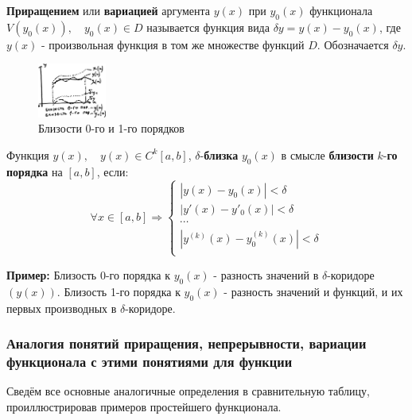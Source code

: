 \documentclass[12pt, a4paper]{article}
\begin{document}
\textbf{Приращением} или \textbf{вариацией} аргумента $y(x)$ при $y_0(x)$ функционала $V(y_0(x)), \quad y_0(x) \in D$ называется функция вида $\delta y = y(x) - y_0(x)$, где $y(x)$ - произвольная функция в том же множестве функций $D$. Обозначается $\delta y$.

\begin{figure}
  \centering
  \includegraphics[width=0.2\textwidth]{20}
  \vspace{-4mm}
  \caption{Близости 0-го и 1-го порядков}
\end{figure}

Функция $y(x), \quad y(x) \in C^k[a, b]$, $\delta$-\textbf{близка} $y_0(x)$ в смысле \textbf{близости} $k$-\textbf{го порядка} на $[a, b]$, если:
\[\forall x \in [a, b] \Rightarrow \begin{cases} |y(x) - y_0(x)| < \delta \\ |y'(x) - y'_0(x)| < \delta \\ \cdots \\ |y^{(k)}(x) - y_0^{(k)}(x)| < \delta \\ \end{cases} \]

\textbf{Пример:} Близость 0-го порядка к $y_0(x)$ - разность значений в $\delta$-коридоре $(y(x))$. Близость 1-го порядка к $y_0(x)$ - разность значений и функций, и их первых производных в $\delta$-коридоре.

\subsubsection{Аналогия понятий приращения, непрерывности, вариации функционала с этими понятиями для функции}

Сведём все основные аналогичные определения в сравнительную таблицу, проиллюстрировав примеров простейшего функционала.

\newpage

\thispagestyle{empty}

\end{document}
